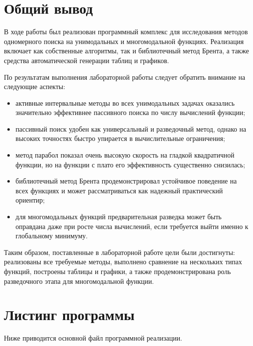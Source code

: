 \documentclass[14pt,a4paper]{extarticle}
\begin{document}
\section{Общий вывод}

В ходе работы был реализован программный комплекс для исследования методов одномерного поиска на унимодальных и многомодальной функциях. Реализация включает как собственные алгоритмы, так и библиотечный метод Брента, а также средства автоматической генерации таблиц и графиков.

По результатам выполнения лабораторной работы следует обратить внимание на следующие аспекты:
\begin{itemize}
    \item активные интервальные методы во всех унимодальных задачах оказались значительно эффективнее пассивного поиска по числу вычислений функции;
    \item пассивный поиск удобен как универсальный и разведочный метод, однако на высоких точностях быстро упирается в вычислительные ограничения;
    \item метод парабол показал очень высокую скорость на гладкой квадратичной функции, но на функции с плато его эффективность существенно снизилась;
    \item библиотечный метод Брента продемонстрировал устойчивое поведение на всех функциях и может рассматриваться как надежный практический ориентир;
    \item для многомодальных функций предварительная разведка может быть оправдана даже при росте числа вычислений, если требуется выйти именно к глобальному минимуму.
\end{itemize}

Таким образом, поставленные в лабораторной работе цели были достигнуты: реализованы все требуемые методы, выполнено сравнение на нескольких типах функций, построены таблицы и графики, а также продемонстрирована роль разведочного этапа для многомодальной функции.

\appendix

\section{Листинг программы}

Ниже приводится основной файл программной реализации.

\end{document}
